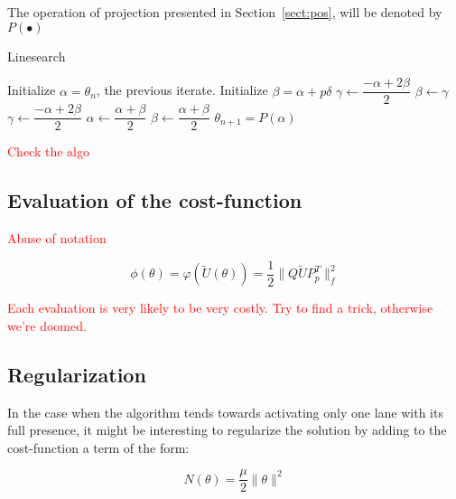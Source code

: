 \documentclass[11pt,a4paper]{article}  %
\begin{document}
The operation of projection presented in Section~\ref{sect:pos}, will be denoted by $P(\bullet)$

\begin{algorithm}[ht]
   \caption{Linesearch}
   \label{alg:linesearch}
   \begin{algorithmic}
      \STATE Initialize $\alpha = \theta_n$, the previous iterate.
      \STATE Initialize $\beta = \alpha + p\delta$
      \STATE $\gamma\leftarrow \dfrac{-\alpha+2\beta}{2}$
      \STATE $\beta\leftarrow\gamma$
      \STATE $\gamma\leftarrow \dfrac{-\alpha+2\beta}{2}$
      \ENDWHILE
      \ENDIF
      \STATE {}
      \STATE $\alpha\leftarrow \dfrac{\alpha+\beta}{2}$
      \ELSE
      \STATE $\beta\leftarrow \dfrac{\alpha+\beta}{2}$
      \ENDIF
      \ENDFOR
      \STATE $\theta_{n+1} = P(\alpha)$
   \end{algorithmic}
\end{algorithm}

\textcolor{red}{Check the algo}

\subsection{Evaluation of the cost-function}

\textcolor{red}{Abuse of notation}

\begin{equation}
\phi(\theta) = \varphi(\tilde{U}(\theta)) = \dfrac{1}{2} \|Q\tilde{U}P_p^T\|_f^2
\end{equation}

\textcolor{red}{Each evaluation is very likely to be very costly. Try to find a trick, otherwise we're doomed.}

\subsection{Regularization}

In the case when the algorithm tends towards activating only one lane with its full presence, it might be interesting to regularize the solution by adding to the cost-function a term of the form:

\begin{equation}
N(\theta) = \dfrac{\mu}{2} \|\theta\|^2
\end{equation}
\end{document}
